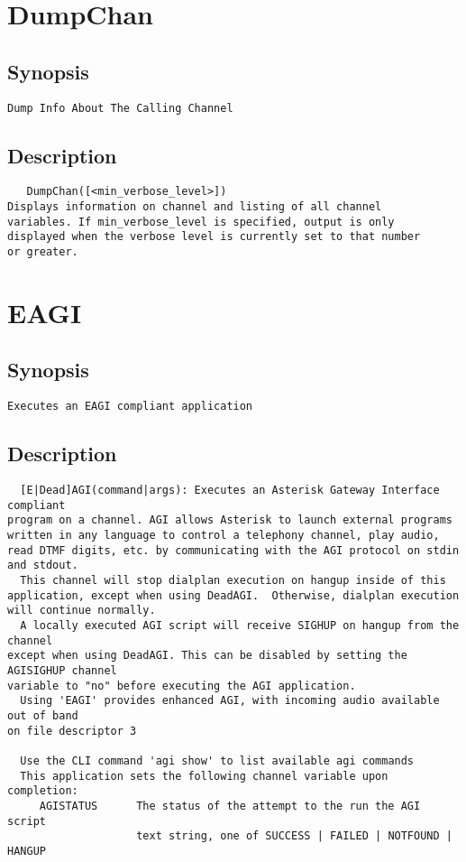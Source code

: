 \section{DumpChan}
\subsection{Synopsis}
\begin{verbatim}
Dump Info About The Calling Channel
\end{verbatim}
\subsection{Description}
\begin{verbatim}
   DumpChan([<min_verbose_level>])
Displays information on channel and listing of all channel
variables. If min_verbose_level is specified, output is only
displayed when the verbose level is currently set to that number
or greater. 

\end{verbatim}


\section{EAGI}
\subsection{Synopsis}
\begin{verbatim}
Executes an EAGI compliant application
\end{verbatim}
\subsection{Description}
\begin{verbatim}
  [E|Dead]AGI(command|args): Executes an Asterisk Gateway Interface compliant
program on a channel. AGI allows Asterisk to launch external programs
written in any language to control a telephony channel, play audio,
read DTMF digits, etc. by communicating with the AGI protocol on stdin
and stdout.
  This channel will stop dialplan execution on hangup inside of this
application, except when using DeadAGI.  Otherwise, dialplan execution
will continue normally.
  A locally executed AGI script will receive SIGHUP on hangup from the channel
except when using DeadAGI. This can be disabled by setting the AGISIGHUP channel
variable to "no" before executing the AGI application.
  Using 'EAGI' provides enhanced AGI, with incoming audio available out of band
on file descriptor 3

  Use the CLI command 'agi show' to list available agi commands
  This application sets the following channel variable upon completion:
     AGISTATUS      The status of the attempt to the run the AGI script
                    text string, one of SUCCESS | FAILED | NOTFOUND | HANGUP

\end{verbatim}


